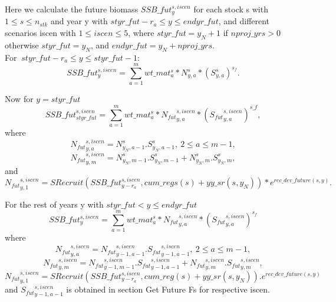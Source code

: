 \documentclass{article}
\begin{document}
Here we calculate the future biomass $SSB\_fut^{s,iscen}_{y}$ for each stock s with $1 \leq s \leq n_{stk}$ and year y with $styr\_fut-r_a\leq y \leq endyr\_fut$, and different scenarios iscen with $1\leq iscen \leq 5$, where $styr\_fut=y_N+1$ if $nproj\_yrs>0$ otherwise $styr\_fut=y_N$, and $endyr\_fut=y_N+nproj\_yrs$.\\

For $\ styr\_fut-r_a\leq y \leq styr\_fut-1$:
\begin{equation}
    SSB\_fut^{s,iscen}_y=\sum_{a=1}^m wt\_{mat}^s_a* N^s_{y,a}*(S^s_{y,a})^{s_f}. 
\end{equation}


Now for $y=styr\_fut$ 
\begin{equation}
    SSB\_fut^{s,iscen}_{styr\_fut}= \sum_{a=1}^mwt\_{mat}^s_a*{N_{fut}}^{s,iscen}_{y,a}*({{S_{fut}}^{s,iscen}_{y,a}})^{s\_f},
\end{equation}
where 
\begin{equation}
    {N_{fut}}^{s,iscen}_{y,a}=N^s_{y_N,a-1}.S^s_{y_N,a-1}, \ 2\leq a \leq m-1,
\end{equation}
\begin{equation}
    {N_{fut}}^{s,iscen}_{y,m}=N^s_{y_N,m-1}.S^s_{y_N,m-1}+N^s_{y_N,m}.S^s_{y_N,m},
\end{equation}
and 
\begin{equation}
{N_{fut}}^{s,iscen}_{y,1}=SRecruit( SSB\_fut^{s,iscen}_{y-r_a},cum\_regs(s)+yy\_sr(s,y_N) ) * e^{rec\_dev\_future(s,y)}. 
\end{equation}


For the rest of years y with  $styr\_fut < y \leq endyr\_fut$
\begin{equation}
    SSB\_fut^{s,iscen}_y = \sum_{a=1}^m wt\_mat^s_{a}*{N_{fut}}^{s,iscen}_{y,a}*({S_{fut}}^{s,iscen}_{y,a})^{s_f}
\end{equation}
where
\begin{equation}
   {N_{fut}}^{s,iscen}_{y,a}={N_{fut}}^{s,iscen}_{y-1,a-1}.{S_{fut}}^{s,iscen}_{y-1,a-1},  \ 2\leq a \leq m-1,
\end{equation}
\begin{equation}
    {N_{fut}}^{s,iscen}_{y,m}={N_{fut}}^{s,iscen}_{y-1,m-1}.{S_{fut}}^{s,iscen}_{y-1,a-1} + {N_{fut}}^{s,iscen}_{y,m}.{S_{fut}}^{s,iscen}_{y,m},
\end{equation}
\begin{equation}
    {N_{fut}}^{s,iscen}_{y,1}=SRecruit(SSB\_fut^{s,iscen}_{y-r_a},cum\_reg(s)+yy\_sr(s,y_N)).e^{rec\_dev\_future(s,y)}
\end{equation}
and ${S_{fut}}^{s,iscen}_{y-1,a-1}$ is obtained in section Get Future Fs for respective iscen. \\
\end{document}
